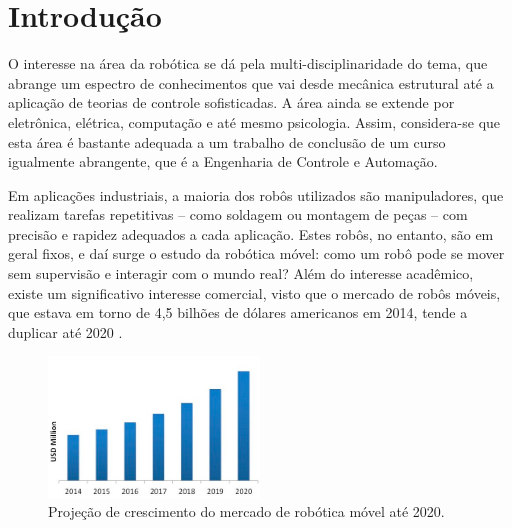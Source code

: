 \section{Introdução}


O interesse na área da robótica se dá pela multi-disciplinaridade do tema, que abrange um espectro de conhecimentos que vai desde mecânica estrutural até a aplicação de teorias de controle sofisticadas. A área ainda se extende por eletrônica, elétrica, computação e até mesmo psicologia. Assim, considera-se que esta área é bastante adequada a um trabalho de conclusão de um curso igualmente abrangente, que é a Engenharia de Controle e Automação.

Em aplicações industriais, a maioria dos robôs utilizados são manipuladores, que realizam tarefas repetitivas -- como soldagem ou montagem de peças -- com precisão e rapidez adequados a cada aplicação. Estes robôs, no entanto, são em geral fixos, e daí surge o estudo da robótica móvel: como um robô pode se mover sem supervisão e interagir com o mundo real? \citep{siegwart2011introduction} Além do interesse acadêmico, existe um significativo interesse comercial, visto que o mercado de robôs móveis, que estava em torno de 4,5 bilhões de dólares americanos em 2014, tende a duplicar até 2020 \citep{marketsmarkets}.

\begin{figure}[h]
  \centering
  \includegraphics[width = 0.5\textwidth]{imagens/markets}
  \caption{Projeção de crescimento do mercado de robótica móvel até 2020.}
  \label{fig:markets}
\end{figure}

